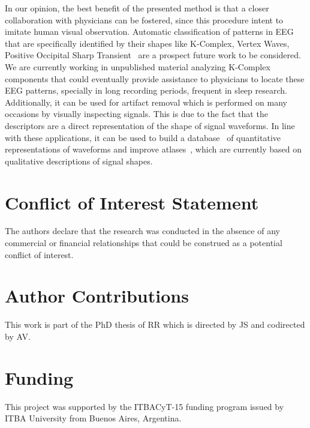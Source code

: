\documentclass[utf8]{frontiersSCNS} %
\begin{document}
In our opinion, the best benefit of the presented method is that a closer collaboration with physicians can be fostered, since this procedure intent to imitate human visual observation.  Automatic classification of patterns in EEG that are specifically identified by their shapes like K-Complex, Vertex Waves, Positive Occipital Sharp Transient~\citep{Hartman2005} are a prospect future work to be considered. We are currently working in unpublished material analyzing K-Complex components that could eventually provide  assistance to physicians to locate these EEG patterns, specially in long recording periods, frequent in sleep research.  
Additionally, it can be used for artifact removal which is performed on many occasions by visually inspecting signals.  This is due to the fact that the descriptors are a direct representation of the shape of signal waveforms. In line with these applications,  it can be used to build a database~\citep{Chavarriaga2017} of quantitative representations of waveforms and improve atlases~\citep{Hartman2005}, which are currently based on qualitative descriptions of signal shapes.

\section*{Conflict of Interest Statement}
The authors declare that the research was conducted in the absence of any commercial or financial relationships that could be construed as a potential conflict of interest.

\section*{Author Contributions}

This work is part of the PhD thesis of RR which is directed by JS and codirected by AV.   

\section*{Funding}
This project was supported by the ITBACyT-15 funding program issued by ITBA University from Buenos Aires, Argentina.


\end{document}
